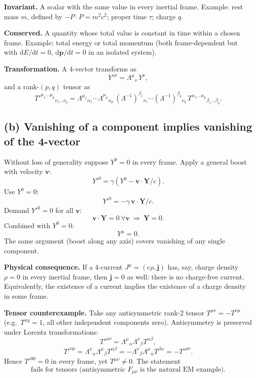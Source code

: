 \documentclass[11pt]{article}
\newcommand{\de}{\mathrm{d}}
\begin{document}
\textbf{Invariant.} A scalar with the same value in every inertial frame. Example: rest mass $m$, defined by $-P\cdot P = m^2 c^2$; proper time $\tau$; charge $q$.

\textbf{Conserved.} A quantity whose total value is constant in time within a chosen frame. Example: total energy or total momentum (both frame-dependent but with $\de E/\de t=0$, $\de\bm p/\de t=0$ in an isolated system).

\textbf{Transformation.} A 4-vector transforms as
\[ Y'^\mu = \Lambda^\mu{}_\nu\,Y^\nu, \]
and a rank-$(p,q)$ tensor as
\[ T'^{\mu_1\dots\mu_p}{}_{\nu_1\dots\nu_q} = \Lambda^{\mu_1}{}_{\alpha_1}\cdots\Lambda^{\mu_p}{}_{\alpha_p}\,(\Lambda^{-1})^{\beta_1}{}_{\nu_1}\cdots(\Lambda^{-1})^{\beta_q}{}_{\nu_q}\,T^{\alpha_1\dots\alpha_p}{}_{\beta_1\dots\beta_q}. \]

\subsection*{(b) Vanishing of a component implies vanishing of the 4-vector}

Without loss of generality suppose $Y^0=0$ in every frame. Apply a general boost with velocity $\bm v$:
\[ Y'^0 = \gamma(Y^0 - \bm v\cdot\bm Y/c). \]
Use $Y^0 = 0$:
\[ Y'^0 = -\gamma\,\bm v\cdot\bm Y/c. \]
Demand $Y'^0 = 0$ for all $\bm v$:
\[ \bm v\cdot\bm Y = 0\ \forall\bm v\ \Longrightarrow\ \bm Y = 0. \]
Combined with $Y^0=0$:
\begin{equation}
\boxed{Y^\mu = 0.}
\end{equation}
The same argument (boost along any axis) covers vanishing of any single component.

\textbf{Physical consequence.} If a 4-current $J^\mu=(c\rho,\bm j)$ has, say, charge density $\rho=0$ in every inertial frame, then $\bm j=0$ as well: there is no charge-free current. Equivalently, the existence of a current implies the existence of a charge density in some frame.

\textbf{Tensor counterexample.} Take any antisymmetric rank-2 tensor $T^{\mu\nu}=-T^{\nu\mu}$ (e.g.\ $T^{xy}=1$, all other independent components zero). Antisymmetry is preserved under Lorentz transformations:
\[ T'^{\mu\nu} = \Lambda^\mu{}_\alpha\Lambda^\nu{}_\beta T^{\alpha\beta}, \]
\[ T'^{\nu\mu} = \Lambda^\nu{}_\alpha\Lambda^\mu{}_\beta T^{\alpha\beta} = -\Lambda^\nu{}_\beta\Lambda^\mu{}_\alpha T^{\beta\alpha} = -T'^{\mu\nu}. \]
Hence $T'^{00}=0$ in every frame, yet $T^{\mu\nu}\neq 0$. The statement
\begin{equation}
\boxed{\text{fails for tensors (antisymmetric }F_{\mu\nu}\text{ is the natural EM example).}}
\end{equation}
\end{document}
